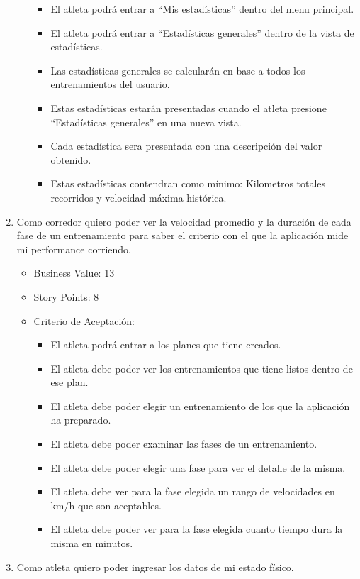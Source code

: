 \begin{enumerate}
\begin{itemize}
    \begin{itemize}
    \itemsep1pt\parskip0pt
    \item
      El atleta podrá entrar a ``Mis estadísticas'' dentro del menu
      principal.
    \item
      El atleta podrá entrar a ``Estadísticas generales'' dentro de la
      vista de estadísticas.
    \item
      Las estadísticas generales se calcularán en base a todos los
      entrenamientos del usuario.
    \item
      Estas estadísticas estarán presentadas cuando el atleta presione
      ``Estadísticas generales'' en una nueva vista.
    \item
      Cada estadística sera presentada con una descripción del valor
      obtenido.
    \item
      Estas estadísticas contendran como mínimo: Kilometros totales
      recorridos y velocidad máxima histórica.
    \end{itemize}
  \end{itemize}
\item
  Como corredor quiero poder ver la velocidad promedio y la duración de
  cada fase de un entrenamiento para saber el criterio con el que la
  aplicación mide mi performance corriendo.

  \begin{itemize}
  \itemsep1pt\parskip0pt
  \item
    Business Value: 13
  \item
    Story Points: 8
  \item
    Criterio de Aceptación:

    \begin{itemize}
    \itemsep1pt\parskip0pt
    \item
      El atleta podrá entrar a los planes que tiene creados.
    \item
      El atleta debe poder ver los entrenamientos que tiene listos
      dentro de ese plan.
    \item
      El atleta debe poder elegir un entrenamiento de los que la
      aplicación ha preparado.
    \item
      El atleta debe poder examinar las fases de un entrenamiento.
    \item
      El atleta debe poder elegir una fase para ver el detalle de la
      misma.
    \item
      El atleta debe ver para la fase elegida un rango de velocidades en
      km/h que son aceptables.
    \item
      El atleta debe poder ver para la fase elegida cuanto tiempo dura
      la misma en minutos.
    \end{itemize}
  \end{itemize}
\item
  Como atleta quiero poder ingresar los datos de mi estado físico.


\end{enumerate}

